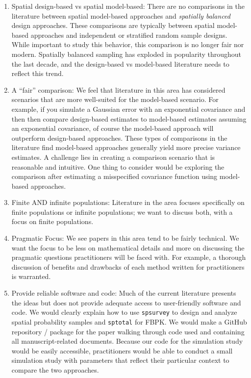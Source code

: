 \begin{enumerate}
  \item Spatial design-based vs spatial model-based: There are no comparisons in the literature between spatial model-based approaches and \emph{spatially balanced} design approaches. These comparisons are typically between spatial model-based approaches and independent or stratified random sample designs. While important to study this behavior, this comparison is no longer fair nor modern. Spatially balanced sampling has exploded in popularity throughout the last decade, and the design-based vs model-based literature needs to reflect this trend.
  \item A ``fair'' comparison: We feel that literature in this area has considered scenarios that are more well-suited for the model-based scenario. For example, if you simulate a Gaussian error with an exponential covariance and then then compare design-based estimates to model-based estimates assuming an exponential covariance, of course the model-based approach will outperform design-based approaches. These types of comparisons in the literature find model-based approaches generally yield more precise variance estimates. A challenge lies in creating a comparison scenario that is reasonable and intuitive. One thing to consider would be exploring the comparison after estimating a misspecified covariance function using model-based approaches. 
  \item Finite AND infinite populations: Literature in the area focuses specifically on finite populations or infinite populations; we want to discuss both, with a focus on finite populations.
  \item Pragmatic Focus: We see papers in this area tend to be fairly technical. We want the focus to be less on mathematical details and more on discussing the pragmatic questions practitioners will be faced with. For example, a thorough discussion of benefits and drawbacks of each method written for practitioners is warranted.
  \item Provide reliable software and code: Much of the current literature presents the ideas but does not provide adequate access to user-friendly software and code. We would clearly explain how to use \texttt{spsurvey} to design and analyze spatial probability samples and \texttt{sptotal} for FBPK. We would make a GitHub repository / package for the paper walking through code used and containing all manuscript-related documents. Because our code for the simulation study would be easily accessible, practitioners would be able to conduct a small simulation study with parameters that reflect their particular context to compare the two approaches.

\end{enumerate}

